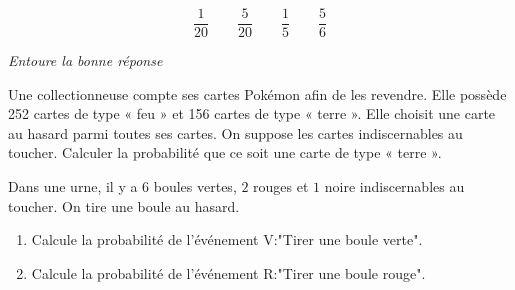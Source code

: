 \begin{pageParcoursu}
 $$ \dfrac{1}{20} \quad\quad \dfrac{5}{20} \quad\quad \dfrac{1}{5} \quad\quad \dfrac{5}{6} $$
 
 \textit{Entoure la bonne réponse}
 

 

Une collectionneuse compte ses cartes Pokémon afin de les revendre. Elle possède 252 cartes de type « feu » et 156 cartes de type « terre ». Elle choisit une carte au hasard parmi toutes ses cartes. On suppose les cartes indiscernables au toucher.
Calculer la probabilité que ce soit une carte de type « terre ». 


Dans une urne, il y a $6$ boules vertes, $2$ rouges et $1$ noire indiscernables au toucher. On tire une boule au hasard. 


\begin{enumerate}
\item Calcule la probabilité de l'événement V:"Tirer une boule verte". 
\item Calcule la probabilité de l'événement R:"Tirer une boule rouge". 
\end{enumerate}

\end{pageParcoursu}
